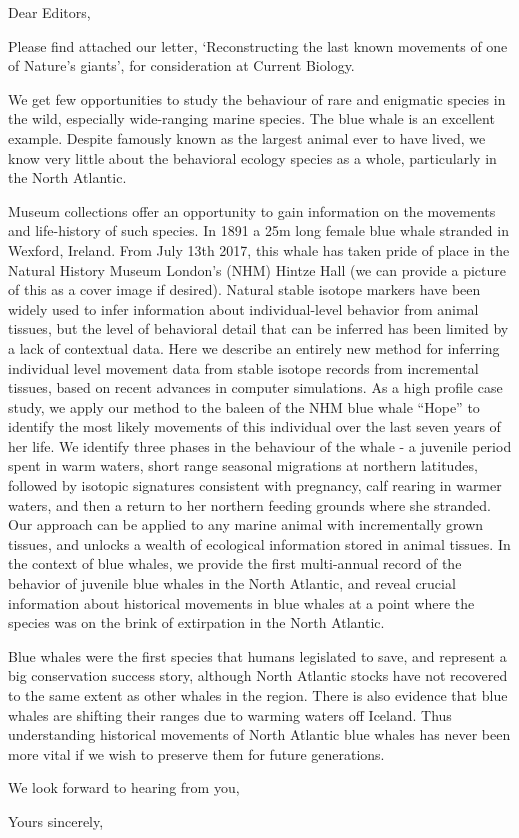 \documentclass[11pt]{letter}
\begin{document}
\begin{letter}{}
\opening{Dear Editors,}

Please find attached our letter, `Reconstructing the last known movements of one of Nature's giants', for consideration at Current Biology.

We get few opportunities to study the behaviour of rare and enigmatic species in the wild, especially wide-ranging marine species. 
The blue whale is an excellent example. 
Despite famously known as the largest animal ever to have lived, we know very little about the behavioral ecology species as a whole, particularly in the North Atlantic.

Museum collections offer an opportunity to gain information on the movements and life-history of such species. 
In 1891 a 25m long female blue whale stranded in Wexford, Ireland. 
From July 13th 2017, this whale has taken pride of place in the Natural History Museum London's (NHM) Hintze Hall (we can provide a picture of this as a cover image if desired).
Natural stable isotope markers have been widely used to infer information about individual-level behavior from animal tissues, but the level of behavioral detail that can be inferred has been limited by a lack of contextual data. 
Here we describe an entirely new method for inferring individual level movement data from stable isotope records from incremental tissues, based on recent advances in computer simulations. 
As a high profile case study, we apply our method to the baleen of the NHM blue whale ``Hope'' to identify the most likely movements of this individual over the last seven years of her life. 
We identify three phases in the behaviour of the whale - a juvenile period spent in warm waters, short range seasonal migrations at northern latitudes, followed by isotopic signatures consistent with pregnancy, calf rearing in warmer waters, and then a return to her northern feeding grounds where she stranded. 
Our approach can be applied to any marine animal with incrementally grown tissues, and unlocks a wealth of ecological information stored in animal tissues. 
In the context of blue whales, we provide the first multi-annual record of the behavior of juvenile blue whales in the North Atlantic, and reveal crucial information about historical movements in blue whales at a point where the species was on the brink of extirpation in the North Atlantic.

Blue whales were the first species that humans legislated to save, and represent a big conservation success story, although North Atlantic stocks have not recovered to the same extent as other whales in the region. 
There is also evidence that blue whales are shifting their ranges due to warming waters off Iceland. 
Thus understanding historical movements of North Atlantic blue whales has never been more vital if we wish to preserve them for future generations.
 
We look forward to hearing from you,


\closing{Yours sincerely,}


\end{letter}
\end{document}
